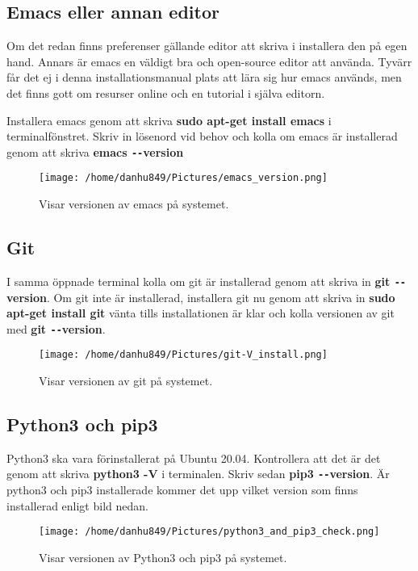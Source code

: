 \documentclass{TDP003mall}
\begin{document}
\subsection{Emacs eller annan editor}
Om det redan finns preferenser gällande editor att skriva i installera den på egen hand. Annars är emacs en väldigt bra och open-source editor att använda. Tyvärr får det ej i denna installationsmanual plats att lära sig hur emacs används, men det finns gott om resurser online och en tutorial i själva editorn.

Installera emacs genom att skriva \textbf{sudo apt-get install emacs} i terminalfönstret. Skriv in lösenord vid behov och kolla om emacs är installerad genom att skriva \textbf{emacs \texttt{-{}-}version}
\begin{figure}[h]
  \centerline{\texttt{[image: /home/danhu849/Pictures/emacs\_version.png]}}
  \caption{Visar versionen av emacs på systemet.}
  \label{fig}
\end{figure}

\subsection{Git}
I samma öppnade terminal kolla om git är installerad genom att skriva in \textbf{git \texttt{-{}-}version}. Om git inte är installerad, installera git nu genom att skriva in \textbf{sudo apt-get install git} vänta tills installationen är klar och kolla versionen av git med \textbf{git \texttt{-{}-}version}.
\begin{figure}[h]
  \centerline{\texttt{[image: /home/danhu849/Pictures/git-V\_install.png]}}
  \caption{Visar versionen av git på systemet.}
  \label{fig}
\end{figure}

\subsection{Python3 och pip3}
Python3 ska vara förinstallerat på Ubuntu 20.04. Kontrollera att det är det genom att skriva \textbf{python3 -V} i terminalen. Skriv sedan \textbf{pip3 \texttt{-{}-}version}. Är python3 och pip3 installerade kommer det upp vilket version som finns installerad enligt bild nedan.
\begin{figure}[h]
  \centerline{\texttt{[image: /home/danhu849/Pictures/python3\_and\_pip3\_check.png]}}
  \caption{Visar versionen av Python3 och pip3 på systemet.}
  \label{fig}
\end{figure}
\end{document}
